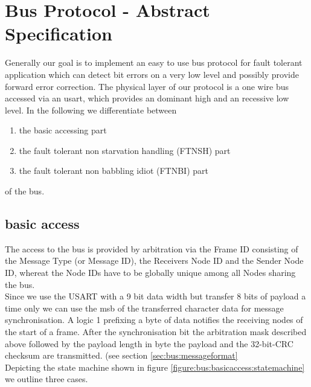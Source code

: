\section{Bus Protocol - Abstract Specification}
\label{sec:bus:specification}

Generally our goal is to implement an easy to use bus protocol for fault tolerant application which can detect bit errors on a very low level and possibly provide forward error correction.
The physical layer of our protocol is a one wire bus accessed via an usart, which provides an dominant high and an recessive low level.
In the following we differentiate between

\begin{enumerate}
 \item the basic accessing part 
 \item the fault tolerant non starvation handling (FTNSH) part
 \item the fault tolerant non babbling idiot (FTNBI) part
\end{enumerate}

of the bus.\\

\label{figure:bus:basicaccess:statemachine}


\subsection{basic access}
\label{sec:bus:basicaccess}

The access to the bus is provided by arbitration via the Frame ID consisting of the Message Type (or Message ID), the Receivers Node ID  and the Sender Node ID, whereat the Node IDs have to be globally unique among all Nodes sharing the bus.\\

Since we use the USART with a 9 bit data width but transfer 8 bits of payload a time only we can use the msb of the transferred character data for message synchronisation. A logic 1 prefixing a byte of data notifies the receiving nodes of the start of a frame.
After the synchronisation bit the arbitration mask described above followed by the payload length in byte the payload and the 32-bit-CRC checksum are transmitted. (see section \ref{sec:bus:messageformat}\\

Depicting the state machine shown in figure \ref{figure:bus:basicaccess:statemachine} we outline three cases.

